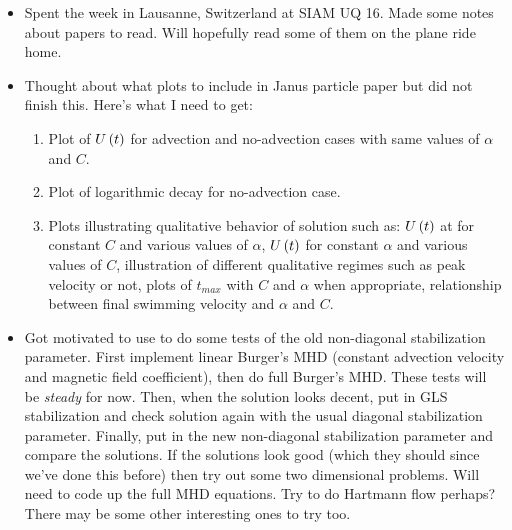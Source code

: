 \begin{itemize}
  \item Spent the week in Lausanne, Switzerland at SIAM UQ 16.  Made some notes about papers to read.  Will hopefully read some of them on the plane ride home.
  \item Thought about what plots to include in Janus particle paper but did not finish this.  Here's what I need to get:
    \begin{enumerate}
      \item Plot of $U\left(t\right)$ for advection and no-advection cases with same values of $\alpha$ and $C$.
      \item Plot of logarithmic decay for no-advection case.
      \item Plots illustrating qualitative behavior of solution such as:  $U\left(t\right)$ at for constant $C$ and various values of $\alpha$, $U\left(t\right)$ for constant $\alpha$ and various values of $C$, illustration of different qualitative regimes such as peak velocity or not, plots of $t_{max}$ with $C$ and $\alpha$ when appropriate, relationship between final swimming velocity and $\alpha$ and $C$.
    \end{enumerate}
  \item Got motivated to use \fenics to do some tests of the old non-diagonal stabilization parameter.  First implement linear Burger's MHD (constant advection velocity and magnetic field coefficient), then do full Burger's MHD.  These tests will be \textit{steady} for now.  Then, when the solution looks decent, put in GLS stabilization and check solution again with the usual diagonal stabilization parameter.  Finally, put in the new non-diagonal stabilization parameter and compare the solutions.  If the solutions look good (which they should since we've done this before) then try out some two dimensional problems.  Will need to code up the full MHD equations.  Try to do Hartmann flow perhaps?  There may be some other interesting ones to try too.
\end{itemize}



